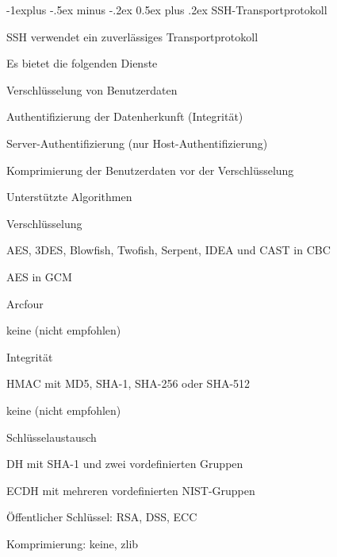 \documentclass[a4paper]{article}
\makeatletter
\renewcommand{\subsection}{\@startsection{subsection}{2}{0mm}%
 {-1explus -.5ex minus -.2ex}%
 {0.5ex plus .2ex}%
 {\normalfont\normalsize\bfseries}}
\makeatother
\begin{document}
\begin{multicols}{3}
      \subsection{SSH-Transportprotokoll}
      \begin{itemize*}
            \item SSH verwendet ein zuverlässiges Transportprotokoll
            \item Es bietet die folgenden Dienste
            \begin{itemize*}
                  \item Verschlüsselung von Benutzerdaten
                  \item Authentifizierung der Datenherkunft (Integrität)
                  \item Server-Authentifizierung (nur Host-Authentifizierung)
                  \item Komprimierung der Benutzerdaten vor der Verschlüsselung
            \end{itemize*}
            \item Unterstützte Algorithmen
            \begin{itemize*}
                  \item Verschlüsselung
                  \begin{itemize*}
                        \item AES, 3DES, Blowfish, Twofish, Serpent, IDEA und CAST in CBC
                        \item AES in GCM
                        \item Arcfour %
                        \item keine (nicht empfohlen)
                  \end{itemize*}
                  \item Integrität
                  \begin{itemize*}
                        \item HMAC mit MD5, SHA-1, SHA-256 oder SHA-512
                        \item keine (nicht empfohlen)
                  \end{itemize*}
                  \item Schlüsselaustausch
                  \begin{itemize*}
                        \item DH mit SHA-1 und zwei vordefinierten Gruppen
                        \item ECDH mit mehreren vordefinierten NIST-Gruppen %
                        \item Öffentlicher Schlüssel: RSA, DSS, ECC %
                  \end{itemize*}
                  \item Komprimierung: keine, zlib %
            \end{itemize*}
      \end{itemize*}


\end{multicols}
\end{document}
